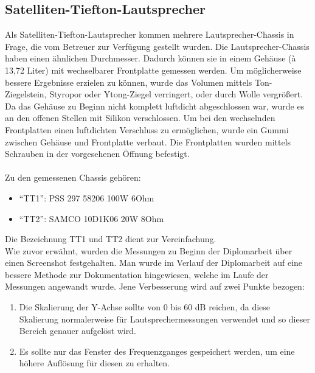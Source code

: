 \subsection*{Satelliten-Tiefton-Lautsprecher} \label{4.2.4}
Als Satelliten-Tiefton-Lautsprecher kommen mehrere Lautsprecher-Chassis in Frage, die vom Betreuer zur Verfügung gestellt wurden.
Die Lautsprecher-Chassis haben einen ähnlichen Durchmesser.
Dadurch können sie in einem Gehäuse (à 13,72 Liter) mit wechselbarer Frontplatte gemessen werden.
Um möglicherweise bessere Ergebnisse erzielen zu können, wurde das Volumen mittels Ton-Ziegelstein, Styropor oder Ytong-Ziegel verringert, oder durch Wolle vergrößert.\\
Da das Gehäuse zu Beginn nicht komplett luftdicht abgeschlossen war, wurde es an den offenen Stellen mit Silikon verschlossen.
Um bei den wechselnden Frontplatten einen luftdichten Verschluss zu ermöglichen, wurde ein Gummi zwischen Gehäuse und Frontplatte verbaut.
Die Frontplatten wurden mittels Schrauben in der vorgesehenen Öffnung befestigt.\\ \\
Zu den gemessenen Chassis gehören:
\begin{itemize}
	\item \enquote{TT1}: PSS 297 58206 100W 6Ohm
	\item \enquote{TT2}: SAMCO 10D1K06 20W 8Ohm
\end{itemize}
Die Bezeichnung TT1 und TT2 dient zur Vereinfachung.\\

Wie zuvor erwähnt, wurden die Messungen zu Beginn der Diplomarbeit über einen Screenshot festgehalten.
Man wurde im Verlauf der Diplomarbeit auf eine bessere Methode zur Dokumentation hingewiesen, welche im Laufe der Messungen angewandt wurde.
Jene Verbesserung wird auf zwei Punkte bezogen:\\
\begin{enumerate}
	\item Die Skalierung der Y-Achse sollte von 0 bis 60 dB reichen, da diese Skalierung normalerweise für Lautsprechermessungen verwendet und so dieser Bereich genauer aufgelöst wird.
	\item Es sollte nur das Fenster des Frequenzganges gespeichert werden, um eine höhere Auflösung für diesen zu erhalten.
\end{enumerate}

